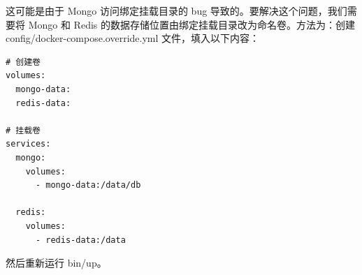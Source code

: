 这可能是由于 Mongo 访问绑定挂载目录的 bug 导致的。要解决这个问题，我们需要将 Mongo 和 Redis 的数据存储位置由绑定挂载目录改为命名卷。方法为：创建 config/docker-compose.override.yml 文件，填入以下内容：
\begin{verbatim}
# 创建卷
volumes:
  mongo-data:
  redis-data:

# 挂载卷
services:
  mongo:
    volumes:
      - mongo-data:/data/db

  redis:
    volumes:
      - redis-data:/data
\end{verbatim}
然后重新运行 bin/up。




































